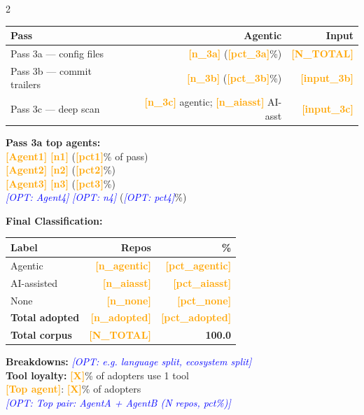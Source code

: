 \documentclass[10pt,a4paper]{article}
\newcommand{\FILLIN}[1]{\textcolor{orange}{\textbf{[#1]}}}
\newcommand{\OPT}[1]{\textcolor{blue}{\textit{[OPT: #1]}}}
\begin{document}
\begin{multicols}{2}

\begin{tabular}{@{}lrr@{}}
\toprule
Pass & Agentic & Input \\
\midrule
Pass 3a --- config files    & \FILLIN{n\_3a} (\FILLIN{pct\_3a}\%) & \FILLIN{N\_TOTAL} \\
Pass 3b --- commit trailers & \FILLIN{n\_3b} (\FILLIN{pct\_3b}\%) & \FILLIN{input\_3b} \\
Pass 3c --- deep scan       & \FILLIN{n\_3c} agentic; \FILLIN{n\_aiasst} AI-asst & \FILLIN{input\_3c} \\
\bottomrule
\end{tabular}

\textbf{Pass 3a top agents:}\\
\FILLIN{Agent1} \quad \FILLIN{n1} (\FILLIN{pct1}\% of pass)\\
\FILLIN{Agent2} \quad \FILLIN{n2} (\FILLIN{pct2}\%)\\
\FILLIN{Agent3} \quad \FILLIN{n3} (\FILLIN{pct3}\%)\\
\OPT{Agent4} \quad \OPT{n4} (\OPT{pct4}\%)

\columnbreak

\textbf{Final Classification:}

\begin{tabular}{@{}lrr@{}}
\toprule
Label & Repos & \% \\
\midrule
Agentic      & \FILLIN{n\_agentic}   & \FILLIN{pct\_agentic} \\
AI-assisted  & \FILLIN{n\_aiasst}    & \FILLIN{pct\_aiasst} \\
None         & \FILLIN{n\_none}      & \FILLIN{pct\_none} \\
\midrule
\textbf{Total adopted} & \textbf{\FILLIN{n\_adopted}} & \textbf{\FILLIN{pct\_adopted}} \\
\textbf{Total corpus}  & \textbf{\FILLIN{N\_TOTAL}}   & \textbf{100.0} \\
\bottomrule
\end{tabular}

\vspace{4pt}
\textbf{Breakdowns:} \OPT{e.g. language split, ecosystem split}\\[3pt]
\textbf{Tool loyalty:} \FILLIN{X}\% of adopters use 1 tool\\
\FILLIN{Top agent}: \FILLIN{X}\% of adopters\\
\OPT{Top pair: AgentA + AgentB (N repos, pct\%)}

\end{multicols}
\end{document}
